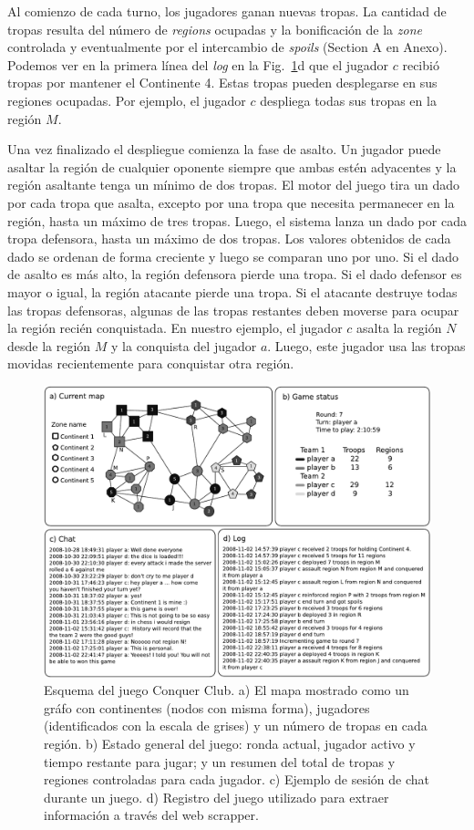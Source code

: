 \documentclass[a4paper,11pt]{book}
\theoremstyle{definition}
\begin{document}

Al comienzo de cada turno, los jugadores ganan nuevas tropas.
%
La cantidad de tropas resulta del n\'umero de \emph{regions} ocupadas y la bonificaci\'on de la \emph{zone} controlada y eventualmente por el intercambio de \emph{spoils} (Section A en Anexo).
%
Podemos ver en la primera l\'inea del \emph{log} en la Fig.~\ref{conquerImage}d que el jugador $c$ recibi\'o tropas por mantener el Continente 4.
%
Estas tropas pueden desplegarse en sus regiones ocupadas.
%
Por ejemplo, el jugador $c$ despliega todas sus tropas en la regi\'on $M$.


Una vez finalizado el despliegue comienza la fase de asalto.
%
Un jugador puede asaltar la regi\'on de cualquier oponente siempre que ambas est\'en adyacentes y la regi\'on asaltante tenga un m\'inimo de dos tropas.
%
El motor del juego tira un dado por cada tropa que asalta, excepto por una tropa que necesita permanecer en la regi\'on, hasta un m\'aximo de tres tropas.
%
Luego, el sistema lanza un dado por cada tropa defensora, hasta un m\'aximo de dos tropas.
%
Los valores obtenidos de cada dado se ordenan de forma creciente y luego se comparan uno por uno.
%
Si el dado de asalto es m\'as alto, la regi\'on defensora pierde una tropa.
%
Si el dado defensor es mayor o igual, la regi\'on atacante pierde una tropa.
%
Si el atacante destruye todas las tropas defensoras, algunas de las tropas restantes deben moverse para ocupar la regi\'on reci\'en conquistada.
%
En nuestro ejemplo, el jugador $c$ asalta la regi\'on $N$ desde la regi\'on $M$ y la conquista del jugador $a$.
%
Luego, este jugador usa las tropas movidas recientemente para conquistar otra regi\'on.

\begin{figure}[ht!]
    \centering
    \includegraphics[width=0.8\linewidth]{figures/Fig5}
    \caption{
    Esquema del juego Conquer Club. a) El mapa mostrado como un gr\'afo con continentes (nodos con misma forma), jugadores (identificados con la escala de grises) y un n\'umero de tropas en cada regi\'on.
    b) Estado general del juego: ronda actual, jugador activo y tiempo restante para jugar; y un resumen del total de tropas y regiones controladas para cada jugador.
    c) Ejemplo de sesi\'on de chat durante un juego.
    d) Registro del juego utilizado para extraer informaci\'on a trav\'es del web scrapper.
    }
    \label{conquerImage}
\end{figure}
\end{document}
